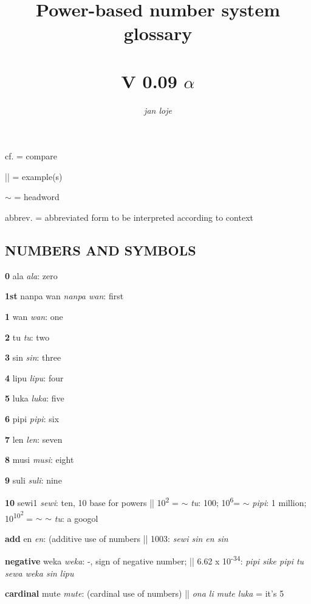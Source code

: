 \documentclass{article}
\title{Power-based number system glossary \\[1ex]{\HHUGE{\tpf lipu-nimi pi nasin nanpa sewi1}} \\ V 0.09 $\alpha$}
\author{\textit{jan loje}}
\begin{document}
\maketitle

\newcommand\tpDef[4]{\textbf{#1} {\Large\tpf #2} \textit{#3}: #4}


\newcommand\tpDefB[3]{\textbf{#1} {\Large\tpf #2}: \textit{#3}}

\setlength{\parskip}{0.3em}

cf. = compare

|| = example(s)

$\sim$ = headword

abbrev. = abbreviated form to be interpreted according to context


\begin{multicols}{2}
\raggedright
\begin{hangparas}{1cm}{1}

\section*{NUMBERS AND SYMBOLS}

\tpDef {0}{ala}{ala}{zero}

\tpDef {1st}{nanpa wan}{nanpa wan}{first}

\tpDef {1}{wan}{wan}{one}

\tpDef {2}{tu}{tu}{two}

\tpDef {3}{sin}{sin}{three}

\tpDef {4}{lipu}{lipu}{four}

\tpDef {5}{luka}{luka}{five}

\tpDef {6}{pipi}{pipi}{six}

\tpDef {7}{len}{len}{seven}

\tpDef {8}{musi}{musi}{eight}

\tpDef {9}{suli}{suli}{nine}

\tpDef {10}{sewi1}{sewi}{ten, 10 base for powers || 10\textsuperscript{2} = $\sim$ \textit{tu}: 100;  10\textsuperscript{6}= $\sim$ \textit{pipi}: 1 million; 10\textsuperscript{10\textsuperscript{2}} = $\sim$ $\sim$ \textit{tu}: a googol }

\tpDef {add}{en}{en}{(additive use of numbers || 1003:\textit{ sewi sin en sin}}

\tpDef {negative}{weka}{weka}{-, sign of negative number; ||  6.62 x 10\textsuperscript{-34}: \textit{pipi sike pipi tu sewa weka sin lipu} }

\tpDef {cardinal}{mute}{mute}{(cardinal use of numbers) || \textit{ona li mute luka} = it's 5}


\end{hangparas}
\end{multicols}
\end{document}
